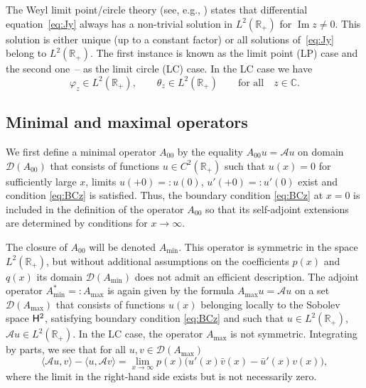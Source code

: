 \documentclass[10pt,a4paper]{amsart}
\numberwithin{equation}{section}
\begin{document}
The Weyl limit point/circle theory (see, e.g., \cite[Chapter~IX]{CoLe}) states that dif\-fe\-ren\-tial equation~\eqref{eq:Jy} always has a non-trivial solution in $L^2 ({\mathbb R}_{+})$ for $\operatorname{Im} z \neq 0$. This solution is either unique (up to a constant factor) or all solutions of~\eqref{eq:Jy} belong to $L^2 ({\mathbb R}_{+})$.
The first instance is known as the limit point (LP) case and the second one~-- as the limit circle (LC) case.
In the LC case we have
 \begin{equation}
\varphi_{z}\in L^2 ({\mathbb R}_{+}),\qquad \theta_{z}\in L^2 ({\mathbb R}_{+})\qquad \mbox{for all}\quad z\in {\mathbb C}.
 \label{eq:PQz}\end{equation}

\subsection{Minimal and maximal operators}\label{section2.2}

 We first define a minimal
 operator $A_{00}$ by the equality $A_{00} u= {\mathcal A} u$ on domain
 $ {\mathcal D} (A_{00}) $ that consists of functions $u\in C ^2 ({\mathbb R}_{+}) $ such that $u(x)=0$ for sufficiently large $x$, limits $u(+0)=: u(0)$, $u'(+0)=: u'(0)$ exist and condition \eqref{eq:BCz} is satisfied.
 Thus, the boundary condition \eqref{eq:BCz} at $x=0$ is included in the definition of the operator $A_{00}$ so that its self-adjoint extensions are determined by conditions for $x\to\infty$.

The closure of $A_{00}$ will be denoted $A_{\min} $. This operator is
symmetric in the space $L^2 ({\mathbb R}_{+})$, but without additional assumptions on the coefficients $p(x)$ and $q(x)$ its domain $ {\mathcal D} (A_{\min}) $ does not admit an efficient description. The adjoint operator $A^*_{\min} =: A_{\max}$ is again given by the formula $A_{\max} u={\mathcal A} u$ on a set $ {\mathcal D} (A_{\max})$ that consists of functions
$u(x)$ belonging locally to the Sobolev space ${\sf H}^2$, satisfying boundary condition \eqref{eq:BCz} and such that $u\in L^2 ({\mathbb R}_{+})$, ${\mathcal A} u\in L^2 ({\mathbb R}_{+})$.
In the LC case, the operator $A_{\max}$ is not symmetric. Integrating by parts, we see that
 for all $u, v \in {\mathcal D} (A_{\max})$
 \[
\langle {\mathcal A} u,v \rangle - \langle u, {\mathcal A} v \rangle = \lim_{x\to\infty} p(x) \big(u'(x)\bar{v} (x)- \bar{u}' (x) v(x)\big),
\]
where the limit in the right-hand side exists but is not necessarily zero.
\end{document}
